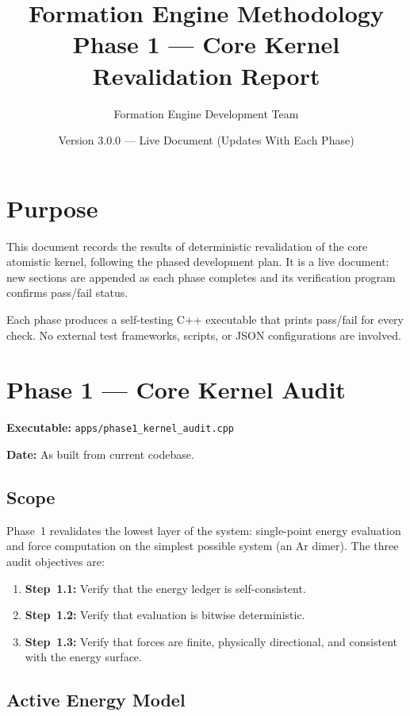 \documentclass[11pt]{article}
\title{\textbf{Formation Engine Methodology} \\
\Large Phase 1 --- Core Kernel Revalidation Report}
\author{Formation Engine Development Team}
\date{Version 3.0.0 --- Live Document (Updates With Each Phase)}
\begin{document}
\maketitle

\section{Purpose}

This document records the results of deterministic revalidation of the core
atomistic kernel, following the phased development plan.  It is a live
document: new sections are appended as each phase completes and its
verification program confirms pass/fail status.

Each phase produces a self-testing C++ executable that prints pass/fail for
every check.  No external test frameworks, scripts, or JSON configurations
are involved.

\section{Phase 1 --- Core Kernel Audit}

\textbf{Executable:} \texttt{apps/phase1\_kernel\_audit.cpp}

\textbf{Date:} As built from current codebase.

\subsection{Scope}

Phase~1 revalidates the lowest layer of the system: single-point energy
evaluation and force computation on the simplest possible system (an Ar
dimer).  The three audit objectives are:

\begin{enumerate}
\item \textbf{Step~1.1:} Verify that the energy ledger is self-consistent.
\item \textbf{Step~1.2:} Verify that evaluation is bitwise deterministic.
\item \textbf{Step~1.3:} Verify that forces are finite, physically directional,
      and consistent with the energy surface.
\end{enumerate}

\subsection{Active Energy Model}
\end{document}
